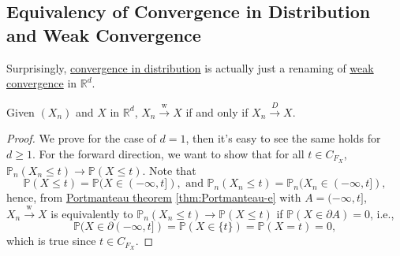 \subsection{Equivalency of Convergence in Distribution and Weak Convergence}
Surprisingly, \hyperref[def:converge-in-distribution]{convergence in distribution} is actually just a renaming of \hyperref[def:converge-weakly]{weak convergence} in \(\mathbb{R} ^d\).

\begin{theorem}\label{thm:weak-convergence-is-convergence-in-distribution}
	Given \((X_n)\) and \(X\) in \(\mathbb{R} ^d\), \(X_n \overset{\text{w} }{\to } X\) if and only if \(X_n \overset{D}{\to } X\).
\end{theorem}
\begin{proof}\let\qed\relax
	We prove for the case of \(d = 1\), then it's easy to see the same holds for \(d \geq 1\). For the forward direction, we want to show that for all \(t \in C_{F_X}\), \(\mathbb{P} _{n}(X_n \leq t) \to \mathbb{P} (X \leq t)\). Note that
	\[
		\mathbb{P} (X \leq t) = \mathbb{P} (X \in (-\infty , t]), \text{ and }
		\mathbb{P} _{n}(X_n \leq t) = \mathbb{P} _{n}(X_n \in (-\infty , t]),
	\]
	hence, from \hyperref[thm:Portmanteau]{Portmanteau theorem} \autoref{thm:Portmanteau-e} with \(A = (-\infty , t]\), \(X_n \overset{\text{w} }{\to } X\) is equivalently to \(\mathbb{P} _{n}(X_n \leq t) \to \mathbb{P} (X \leq t)\) if \(\mathbb{P} (X \in \partial A) = 0\), i.e.,
	\[
		\mathbb{P} (X \in \partial (-\infty , t]) = \mathbb{P} (X \in \{ t \} ) = \mathbb{P} (X = t) = 0,
	\]
	which is true since \(t \in C_{F_X}\).


\end{proof}
